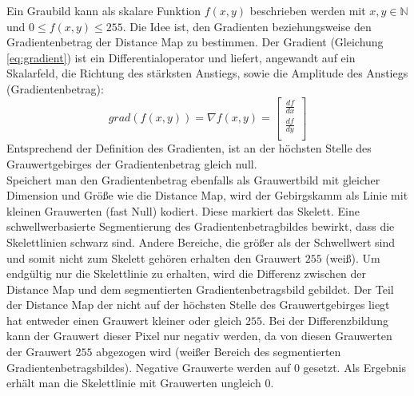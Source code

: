 Ein Graubild kann als skalare Funktion $f(x,y)$ beschrieben werden mit $x,y \in \mathbb{N}$ und
$0 \leq f(x,y) \leq 255$. 
Die Idee ist, den Gradienten beziehungsweise den Gradientenbetrag der Distance Map zu bestimmen. Der Gradient (Gleichung \ref{eq:gradient}) ist ein Differentialoperator und liefert, angewandt auf ein Skalarfeld, die Richtung des stärksten Anstiegs, sowie die Amplitude des Anstiegs (Gradientenbetrag):
\begin{equation}
\label{eq:gradient}
   grad(f(x,y)) = \nabla f(x,y) = \begin{bmatrix}
         \frac{df}{dx}        \\[0.3em]
         \frac{df}{dy} \\[0.3em]
      \end{bmatrix}
\end{equation}
Entsprechend der Definition des Gradienten, ist an der höchsten Stelle des Grauwertgebirges der Gradientenbetrag gleich null.\\
Speichert man den Gradientenbetrag ebenfalls als Grauwertbild mit gleicher Dimension und Größe wie die Distance Map, wird der Gebirgskamm als Linie mit kleinen Grauwerten (fast Null) kodiert. Diese markiert das Skelett. Eine schwellwerbasierte Segmentierung des Gradientenbetragbildes bewirkt, dass die Skelettlinien schwarz sind. Andere Bereiche, die größer als der Schwellwert sind und somit nicht zum Skelett gehören erhalten den Grauwert $255$ (weiß). 
Um endgültig nur die Skelettlinie zu erhalten, wird die Differenz
zwischen der Distance Map und dem segmentierten Gradientenbetragsbild gebildet. Der Teil der Distance Map der nicht
auf der höchsten Stelle des Grauwertgebirges liegt hat entweder einen Grauwert kleiner oder gleich $255$. Bei
der Differenzbildung kann der Grauwert dieser Pixel nur negativ werden, da von diesen Grauwerten der Grauwert $255$ abgezogen wird (weißer Bereich des segmentierten Gradientenbetragsbildes). Negative
Grauwerte werden auf $0$ gesetzt. Als Ergebnis erhält man die Skelettlinie mit Grauwerten ungleich $0$. 
\clearpage
\newpage

